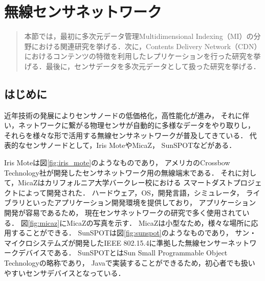 \chapter{無線センサネットワーク}
\begin{large}
\begin{quote}
本節では，最初に多次元データ管理Multidimensional Indexing（MI）の分野における関連研究を挙げる．次に，Contents Delivery Network（CDN）におけるコンテンツの特徴を利用したレプリケーションを行った研究を挙げる．最後に，センサデータを多次元データとして扱った研究を挙げる．
\end{quote}
\end{large}
\clearpage

\section{はじめに}
近年技術の発展によりセンサノードの低価格化，高性能化が進み，
それに伴い，ネットワークに繋がる物理センサが自動的に多様なデータをやり取りし，
それらを様々な形で活用する無線センサネットワークが普及してきている．
代表的なセンサノードとして，Iris MoteやMicaZ\cite{Hill:2002:MWP:623308.624560}，
SunSPOTなどがある．

Iris Moteは図\ref{fig:iris_mote}のようなものであり，
アメリカのCrossbow Technology社が開発したセンサネットワーク用の無線端末である．
それに対して，MicaZはカリフォルニア大学バークレー校における
スマートダストプロジェクト\cite{Kahn:1999:NCC:313451.313558}によって開発された．
ハードウェア，OS，開発言語，シミュレータ，
ライブラリといったアプリケーション開発環境を提供しており，
アプリケーション開発が容易であるため，
現在センサネットワークの研究で多く使用されている．
図\ref{fig:micaz}にMicaZの写真を示す．
MicaZは小型なため，様々な場所に応用することができる．
SunSPOTは図\ref{fig:sunspot}のようなものであり，
サン・マイクロシステムズが開発したIEEE 802.15.4に準拠した無線センサーネットワークデバイスである．
SunSPOTとはSun Small Programmable Object Technologyの略称であり，
Javaで実装することができるため，初心者でも扱いやすいセンサデバイスとなっている．


